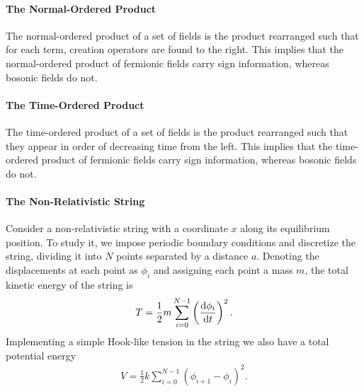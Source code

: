 \paragraph{The Normal-Ordered Product}
The normal-ordered product of a set of fields is the product rearranged such that for each term, creation operators are found to the right. This implies that the normal-ordered product of fermionic fields carry sign information, whereas bosonic fields do not.

\paragraph{The Time-Ordered Product}
The time-ordered product of a set of fields is the product rearranged such that they appear in order of decreasing time from the left. This implies that the time-ordered product of fermionic fields carry sign information, whereas bosonic fields do not.

\paragraph{The Non-Relativistic String}
Consider a non-relativistic string with a coordinate $x$ along its equilibrium position. To study it, we impose periodic boundary conditions and discretize the string, dividing it into $N$ points separated by a distance $a$. Denoting the displacements at each point as $\phi_{i}$ and assigning each point a mass $m$, the total kinetic energy of the string is
\begin{align*}
	T = \frac{1}{2}m\sum\limits_{i = 0}^{N - 1}\left(\dv{\phi_{i}}{t}\right)^{2}.
\end{align*}
Implementing a simple Hook-like tension in the string we also have a total potential energy
\begin{align*}
	V = \frac{1}{2}k\sum\limits_{i = 0}^{N - 1}\left(\phi_{i + 1} - \phi_{i}\right)^{2}.
\end{align*}


